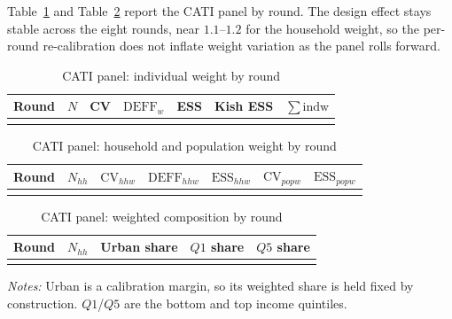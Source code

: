 \documentclass[AEJ]{AEA}
\begin{document}
Table~\ref{tab:catiindw} and Table~\ref{tab:catihhw} report the CATI panel by
round. The design effect stays stable across the eight rounds, near $1.1$--$1.2$
for the household weight, so the per-round re-calibration does not inflate weight
variation as the panel rolls forward.

\begin{table}[!t]
\raggedright
\begin{threeparttable}
\caption{CATI panel: individual weight by round}
\label{tab:catiindw}
\footnotesize
\begin{tabular}{@{}c r r r r r r@{}}
\toprule
Round & $N$ & CV & $\mathrm{DEFF}_w$ & ESS & Kish ESS & $\sum \mathrm{indw}$ \\
\midrule
\\
\bottomrule
\end{tabular}
\end{threeparttable}
\end{table}

\begin{table}[!t]
\raggedright
\begin{threeparttable}
\caption{CATI panel: household and population weight by round}
\label{tab:catihhw}
\footnotesize
\begin{tabular}{@{}c r r r r r r@{}}
\toprule
Round & $N_{hh}$ & $\mathrm{CV}_{hhw}$ & $\mathrm{DEFF}_{hhw}$ & $\mathrm{ESS}_{hhw}$ & $\mathrm{CV}_{popw}$ & $\mathrm{ESS}_{popw}$ \\
\midrule
\\
\bottomrule
\end{tabular}
\end{threeparttable}
\end{table}

\begin{table}[!t]
\raggedright
\begin{threeparttable}
\caption{CATI panel: weighted composition by round}
\label{tab:caticomp}
\footnotesize
\begin{tabular}{@{}c r r r r@{}}
\toprule
Round & $N_{hh}$ & Urban share & $Q1$ share & $Q5$ share \\
\midrule
\\
\bottomrule
\end{tabular}
\begin{tablenotes}\notesize
\item \textit{Notes:} Urban is a calibration margin, so its weighted share is
held fixed by construction. $Q1$/$Q5$ are the bottom and top income quintiles.
\end{tablenotes}
\end{threeparttable}
\end{table}
\end{document}
